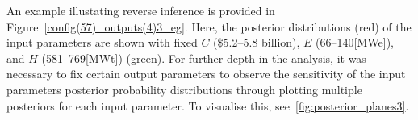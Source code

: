 \documentclass[journal]{IEEEtran}
\begin{document}
An example illustating reverse inference is provided in Figure~\ref{config(57)_outputs(4)3_eg}. Here, the posterior distributions (red) of the input parameters are shown with fixed $C$ (\$5.2--5.8 billion), $E$ (66--140[MWe]), and $H$ (581--769[MWt]) (green). For further depth in the analysis, it was necessary to fix certain output parameters to observe the sensitivity of the input parameters posterior probability distributions through plotting multiple posteriors for each input parameter. To visualise this, see~\ref{fig:posterior_planes3}.






\end{document}
